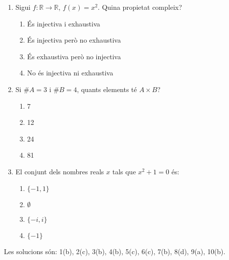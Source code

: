 \begin{enumerate}
\item Sigui $f:\mathbb{R}\rightarrow\mathbb{R}$, $f(x)=x^{2}$. Quina propietat compleix?

\begin{enumerate}
\item \'{E}s injectiva i exhaustiva

\item \'{E}s injectiva per\`{o} no exhaustiva

\item \'{E}s exhaustiva per\`{o} no injectiva

\item No \'{e}s injectiva ni exhaustiva
\end{enumerate}

\item Si $\#A=3$ i $\#B=4$, quants elements t\'{e} $A\times B$?

\begin{enumerate}
\item 7

\item 12

\item 24

\item 81
\end{enumerate}

\item El conjunt dels nombres reals $x$ tals que $x^{2}+1=0$ \'{e}s:

\begin{enumerate}
\item $\{-1,1\}$

\item $\emptyset$

\item $\{-i,i\}$

\item $\{-1\}$
\end{enumerate}

\end{enumerate}

\bigskip

Les solucions s\'{o}n: 1(b), 2(c), 3(b), 4(b), 5(c), 6(c), 7(b), 8(d), 9(a), 10(b).
